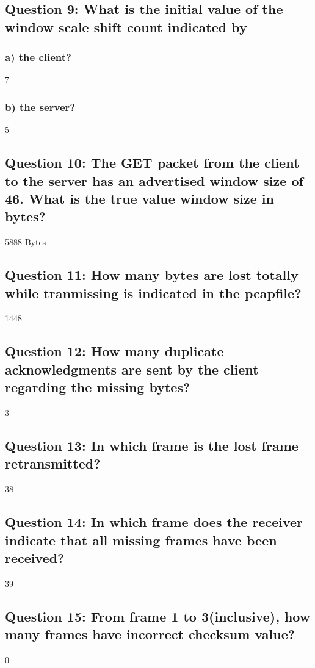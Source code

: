 \documentclass[11pt, oneside, a4paper]{article}
\begin{document}
\subsection*{Question 9: What is the initial value of the window scale shift count indicated by}
    \subsubsection*{a) the client?}
    7

    \subsubsection*{b) the server?}
    5

\subsection*{Question 10: The GET packet from the client to the server has an advertised window size of 46. What is the true value window size in bytes?}
5888 Bytes

\subsection*{Question 11: How many bytes are lost totally while tranmissing is indicated in the pcapfile?}
1448

\subsection*{Question 12: How  many  duplicate  acknowledgments  are  sent  by  the  client  regarding the missing bytes?}
3

\subsection*{Question 13: In which frame is the lost frame retransmitted?}
38

\subsection*{Question 14: In  which  frame  does  the  receiver  indicate  that all  missing  frames  have  been received?}
39

\subsection*{Question 15: From frame 1 to 3(inclusive), how many frames have incorrect checksum value?}
0
\end{document}
